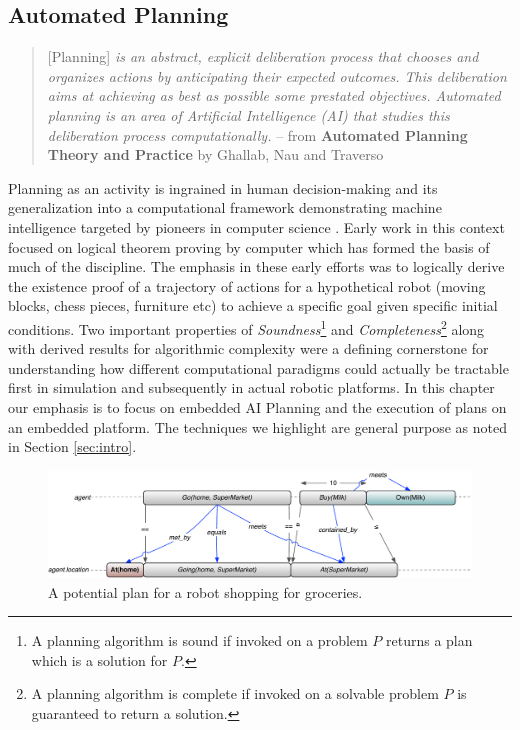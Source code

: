 \subsection{Automated Planning}
\label{sec:planningfound}

{\scriptsize
  \begin{quote} [Planning] \emph{is an abstract, explicit deliberation
      process that chooses and organizes actions by anticipating their
      expected outcomes. This deliberation aims at achieving as best
      as possible some prestated objectives. Automated planning is an
      area of Artificial Intelligence (AI) that studies this
      deliberation process computationally.} -- from \textbf{Automated
      Planning Theory and Practice} by Ghallab, Nau and Traverso
    \cite{ghallab04}
\end{quote}
}

Planning as an activity is ingrained in human decision-making
\cite{berthoz} and its generalization into a computational framework
demonstrating machine intelligence 
targeted by pioneers in computer science
\cite{computersthought}. Early work in this context focused on logical
theorem proving by computer \cite{green69} which has formed the basis
of much of the discipline. The emphasis in these early efforts was to
logically derive the existence proof of a trajectory of actions for a
hypothetical robot (moving blocks, chess pieces, furniture etc) to
achieve a specific goal given specific initial conditions. Two
important properties of \emph{Soundness}\footnote{A planning algorithm
  is sound if invoked on a problem $P$ returns a plan which is a
  solution for $P$.} and \emph{Completeness}\footnote{A planning
  algorithm is complete if invoked on a solvable problem $P$ is
  guaranteed to return a solution.} along with derived results for
algorithmic complexity \cite{gareyjohnson,corman} were a defining
cornerstone for understanding how different computational paradigms
could actually be tractable first in simulation and subsequently in
actual robotic platforms. In this chapter our emphasis is to focus on
embedded AI Planning and the execution of plans on an embedded
 platform. The techniques we highlight are
general purpose as noted in Section \ref{sec:intro}.

\begin{figure}[b]
\centering
  \includegraphics[scale=0.45]{figs/shopping_europa.pdf}
  \caption{\small A potential plan for a robot shopping for groceries.}
\label{fig:shop:shopping}
\end{figure}

